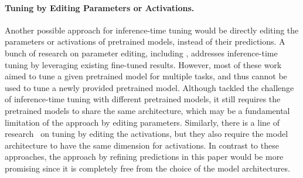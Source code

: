 \paragraph{Tuning by Editing Parameters or Activations.}
Another possible approach for inference-time tuning would be directly editing the parameters or activations of pretrained models, instead of their predictions.
A bunch of research on parameter editing, including \citep{ilharco2023editing,gueta2023knowledge,ortiz2024task,yadav2024ties,chijiwa2024transferring,daheim2024model}, addresses inference-time tuning by leveraging existing fine-tuned results.
However, most of these work aimed to tune a given pretrained model for multiple tasks, and thus cannot be used to tune a newly provided pretrained model.
Although \citet{chijiwa2024transferring} tackled the challenge of inference-time tuning with different pretrained models, it still requires the pretrained models to share the same architecture, which may be a fundamental limitation of the approach by editing parameters.
Similarly, there is a line of research~\citep{dathathri2020plug,hernandez2023inspecting,chuang2024dola,li2024inference} on tuning by editing the activations, but they also require the model architecture to have the same dimension for activations.
In contrast to these approaches, the approach by refining predictions in this paper would be more promising since it is completely free from the choice of the model architectures.


\vspace{-0.3cm}
